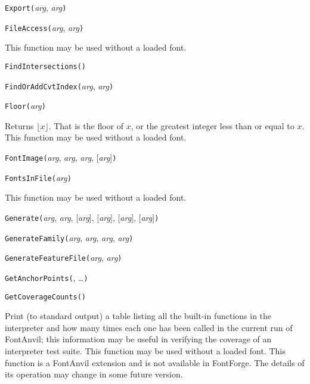 
\noindent\texttt{Export(}\textit{arg}, \textit{arg}\texttt{)}


\noindent\texttt{FileAccess(}\textit{arg}, \textit{arg}\texttt{)}

This function may be used without a loaded font.


\noindent\texttt{FindIntersections(}\texttt{)}


\noindent\texttt{FindOrAddCvtIndex(}\textit{arg}, \textit{arg}\texttt{)}


\noindent\texttt{Floor(}\textit{arg}\texttt{)}

Returns $\lfloor x \rfloor$.  That is the floor of $x$, or the greatest
integer less than or equal to $x$.  This function may be used without a
loaded font.


\noindent\texttt{FontImage(}\textit{arg}, \textit{arg}, \textit{arg}, [\textit{arg}]\texttt{)}


\noindent\texttt{FontsInFile(}\textit{arg}\texttt{)}

This function may be used without a loaded font.


\noindent\texttt{Generate(}\textit{arg}, \textit{arg}, [\textit{arg}], [\textit{arg}], [\textit{arg}], [\textit{arg}]\texttt{)}


\noindent\texttt{GenerateFamily(}\textit{arg}, \textit{arg}, \textit{arg}, \textit{arg}\texttt{)}


\noindent\texttt{GenerateFeatureFile(}\textit{arg}, \textit{arg}\texttt{)}


\noindent\texttt{GetAnchorPoints(}, \ldots\texttt{)}


\noindent\texttt{GetCoverageCounts()}

Print (to standard output) a table listing all the built-in functions in the
interpreter and how many times each one has been called in the current run
of FontAnvil; this information may be useful in verifying the coverage of an
interpreter test suite.
This function may be used without a loaded font.  This function is a
FontAnvil extension and is not available in FontForge.  The details of its
operation may change in some future version.

